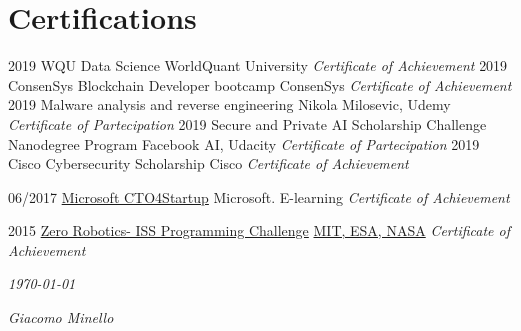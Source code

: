 \documentclass[]{friggeri-cv}
\begin{document}
\section{Certifications}
\begin{entrylist}
 \entry
    {2019}
    {WQU Data Science}
    {WorldQuant University}
    {\emph{Certificate of Achievement}}
   \entry
    {2019}
    {ConsenSys Blockchain Developer bootcamp}
    {ConsenSys}
    {\emph{Certificate of Achievement}}
     \entry
    {2019}
    {Malware analysis and reverse engineering}
    {Nikola Milosevic, Udemy}
    {\emph{Certificate of Partecipation}}
    \entry
    {2019}
    {Secure and Private AI Scholarship Challenge Nanodegree Program}
    {Facebook AI, Udacity}
    {\emph{Certificate of Partecipation}}
     \entry
    {2019}
    {Cisco Cybersecurity Scholarship}
    {Cisco}
    {\emph{Certificate of Achievement}}

     \entry
    {06/2017}
    {\href{https://1drv.ms/b/s!Ap_mQ71ue930rA_aUmWtsK0-eAhH}{Microsoft CTO4Startup}}
    {Microsoft. E-learning}
    {\emph{Certificate of Achievement}}
    
    \entry
    {2015}
    {\href{https://1drv.ms/b/s!Ap_mQ71ue930qnfXZSS-T-ajhUl6}{Zero Robotics- ISS Programming Challenge}}
    {\href{http://zerorobotics.mit.edu/}{MIT, ESA, NASA}}
    {\emph{Certificate of Achievement}}
    


\end{entrylist}

\begin{flushleft}
\emph{\today}
\end{flushleft}
\begin{flushright}
\emph{Giacomo Minello}
\end{flushright}
\end{document}
